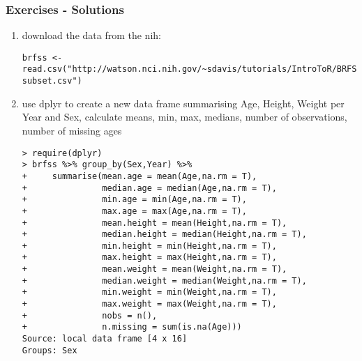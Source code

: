 \begin{frame}\frametitle{Exercises - Solutions}
  \begin{enumerate}
  \item download the data from the nih:\scriptsize
\begin{verbatim}
brfss <- read.csv("http://watson.nci.nih.gov/~sdavis/tutorials/IntroToR/BRFSS-subset.csv")  
\end{verbatim}
\normalsize
  \item use dplyr to create a new data frame summarising Age, Height, Weight per Year and Sex, calculate means, min, max, medians, number of observations, number of missing ages\scriptsize
\begin{verbatim}
> require(dplyr)
> brfss %>% group_by(Sex,Year) %>%
+     summarise(mean.age = mean(Age,na.rm = T),
+               median.age = median(Age,na.rm = T),
+               min.age = min(Age,na.rm = T),
+               max.age = max(Age,na.rm = T),
+               mean.height = mean(Height,na.rm = T),
+               median.height = median(Height,na.rm = T),
+               min.height = min(Height,na.rm = T),
+               max.height = max(Height,na.rm = T),
+               mean.weight = mean(Weight,na.rm = T),
+               median.weight = median(Weight,na.rm = T),
+               min.weight = min(Weight,na.rm = T),
+               max.weight = max(Weight,na.rm = T),
+               nobs = n(),
+               n.missing = sum(is.na(Age)))
Source: local data frame [4 x 16]
Groups: Sex


\end{verbatim}
\end{enumerate}
\end{frame}
